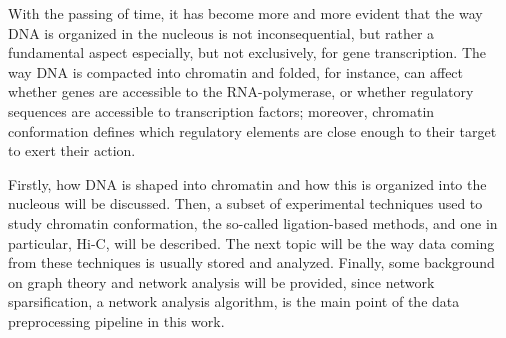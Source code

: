 
With the passing of time, it has become more and more evident that the way DNA is organized in the nucleous is not inconsequential, but rather a fundamental aspect especially, but not exclusively, for gene transcription. The way DNA is compacted into chromatin and folded, for instance, can affect whether genes are accessible to the RNA-polymerase, or whether regulatory sequences are accessible to transcription factors; moreover, chromatin conformation defines which regulatory elements are close enough to their target to exert their action\cite{chromatinfiber2015,chromatinorganization2019}.

Firstly, how DNA is shaped into chromatin and how this is organized into the nucleous will be discussed. Then, a subset of experimental techniques used to study chromatin conformation, the so-called ligation-based methods, and one in particular, Hi-C, will be described. The next topic will be the way data coming from these techniques is usually stored and analyzed. Finally, some background on graph theory and network analysis will be provided, since network sparsification, a network analysis algorithm, is the main point of the data preprocessing pipeline in this work.


